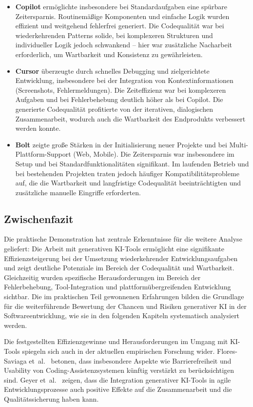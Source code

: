 \begin{itemize}
      \item \textbf{Copilot} ermöglichte insbesondere bei Standardaufgaben eine spürbare Zeitersparnis. Routinemäßige Komponenten und einfache Logik wurden effizient und weitgehend fehlerfrei generiert. Die Codequalität war bei wiederkehrenden Patterns solide, bei komplexeren Strukturen und individueller Logik jedoch schwankend – hier war zusätzliche Nacharbeit erforderlich, um Wartbarkeit und Konsistenz zu gewährleisten.
      \item \textbf{Cursor} überzeugte durch schnelles Debugging und zielgerichtete Entwicklung, insbesondere bei der Integration von Kontextinformationen (Screenshots, Fehlermeldungen). Die Zeiteffizienz war bei komplexeren Aufgaben und bei Fehlerbehebung deutlich höher als bei Copilot. Die generierte Codequalität profitierte von der iterativen, dialogischen Zusammenarbeit, wodurch auch die Wartbarkeit des Endprodukts verbessert werden konnte.
      \item \textbf{Bolt} zeigte große Stärken in der Initialisierung neuer Projekte und bei Multi-Plattform-Support (Web, Mobile). Die Zeitersparnis war insbesondere im Setup und bei Standardfunktionalitäten signifikant. Im laufenden Betrieb und bei bestehenden Projekten traten jedoch häufiger Kompatibilitätsprobleme auf, die die Wartbarkeit und langfristige Codequalität beeinträchtigten und zusätzliche manuelle Eingriffe erforderten.
\end{itemize}

\subsection{Zwischenfazit}

Die praktische Demonstration hat zentrale Erkenntnisse für die weitere Analyse
geliefert: Die Arbeit mit generativen KI-Tools ermöglicht eine signifikante
Effizienzsteigerung bei der Umsetzung wiederkehrender Entwicklungsaufgaben und
zeigt deutliche Potenziale im Bereich der Codequalität und Wartbarkeit.
Gleichzeitig wurden spezifische Herausforderungen im Bereich der
Fehlerbehebung, Tool-Integration und plattformübergreifenden Entwicklung
sichtbar. Die im praktischen Teil gewonnenen Erfahrungen bilden die Grundlage
für die weiterführende Bewertung der Chancen und Risiken generativer KI in der
Softwareentwicklung, wie sie in den folgenden Kapiteln systematisch analysiert
werden.

Die festgestellten Effizienzgewinne und Herausforderungen im Umgang mit
KI-Tools spiegeln sich auch in der aktuellen empirischen Forschung wider.
Flores-Saviaga et~al.~\cite{flores-saviaga_impact_2025} betonen, dass
insbesondere Aspekte wie Barrierefreiheit und Usability von
Coding-Assistenzsystemen künftig verstärkt zu berücksichtigen sind. Geyer
et~al.~\cite{geyer_case_2025} zeigen, dass die Integration generativer KI-Tools
in agile Entwicklungsprozesse auch positive Effekte auf die Zusammenarbeit und
die Qualitätssicherung haben kann.

